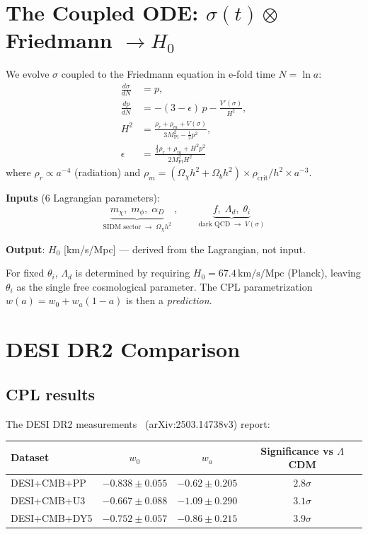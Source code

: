 \documentclass[11pt,a4paper]{article}
\newcommand{\Mpl}{M_{\mathrm{Pl}}}
\newcommand{\Ld}{\Lambda_d}
\newcommand{\kms}{\,\mathrm{km/s/Mpc}}
\begin{document}
\section{The Coupled ODE: $\sigma(t) \otimes$ Friedmann $\to H_0$}
\label{sec:ode}

We evolve $\sigma$ coupled to the Friedmann equation in e-fold time $N = \ln a$:
\begin{align}
  \frac{d\sigma}{dN} &= p, \label{eq:dsigma}\\
  \frac{dp}{dN} &= -(3-\epsilon)\,p - \frac{V'(\sigma)}{H^2}, \label{eq:dp}\\
  H^2 &= \frac{\rho_r + \rho_m + V(\sigma)}{3\Mpl^2 - \tfrac{1}{2}p^2}, \label{eq:friedmann}\\
  \epsilon &= \frac{\tfrac{4}{3}\rho_r + \rho_m + H^2 p^2}{2\Mpl^2 H^2} \label{eq:epsilon}
\end{align}
where $\rho_r \propto a^{-4}$ (radiation) and $\rho_m = (\Omega_\chi h^2 + \Omega_b h^2) \times \rho_\mathrm{crit}/h^2 \times a^{-3}$.

\medskip
\noindent
\textbf{Inputs} (6 Lagrangian parameters):
\[
  \underbrace{m_\chi,\;m_\phi,\;\alpha_D}_{\text{SIDM sector}\;\to\;\Omega_\chi h^2}
  \;,\qquad
  \underbrace{f,\;\Ld,\;\theta_i}_{\text{dark QCD}\;\to\;V(\sigma)}
\]

\noindent
\textbf{Output}: $H_0$ [km/s/Mpc] --- derived from the Lagrangian, not input.

For fixed $\theta_i$, $\Ld$ is determined by requiring $H_0 = 67.4\kms$ (Planck), 
leaving $\theta_i$ as the single free cosmological parameter. 
The CPL parametrization $w(a) = w_0 + w_a(1-a)$ is then a \emph{prediction}.

\section{DESI DR2 Comparison}
\label{sec:desi}

\subsection{CPL results}

The DESI DR2 measurements~\cite{DESI_DR2} (arXiv:2503.14738v3) report:
\begin{center}
\begin{tabular}{@{}lccc@{}}
\toprule
Dataset & $w_0$ & $w_a$ & Significance vs $\Lambda$CDM \\
\midrule
DESI+CMB+PP   & $-0.838 \pm 0.055$ & $-0.62 \pm 0.205$ & $2.8\sigma$ \\
DESI+CMB+U3   & $-0.667 \pm 0.088$ & $-1.09 \pm 0.290$ & $3.1\sigma$ \\
DESI+CMB+DY5  & $-0.752 \pm 0.057$ & $-0.86 \pm 0.215$ & $3.9\sigma$ \\
\bottomrule
\end{tabular}
\end{center}
\end{document}
